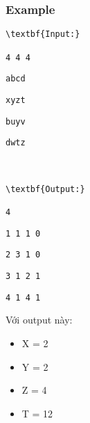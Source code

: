 \subsubsection{Example}
\begin{verbatim}
\textbf{Input:}

4 4 4\end{verbatim}
\begin{verbatim}
abcd\end{verbatim}
\begin{verbatim}
xyzt\end{verbatim}
\begin{verbatim}
buyv\end{verbatim}
\begin{verbatim}
dwtz



\textbf{Output:}

4\end{verbatim}
\begin{verbatim}
1 1 1 0\end{verbatim}
\begin{verbatim}
2 3 1 0\end{verbatim}
\begin{verbatim}
3 1 2 1\end{verbatim}
\begin{verbatim}
4 1 4 1\end{verbatim}

Với output này:
\begin{itemize}
	\item X = 2
	\item Y = 2
	\item Z = 4
	\item T = 12
\end{itemize}
